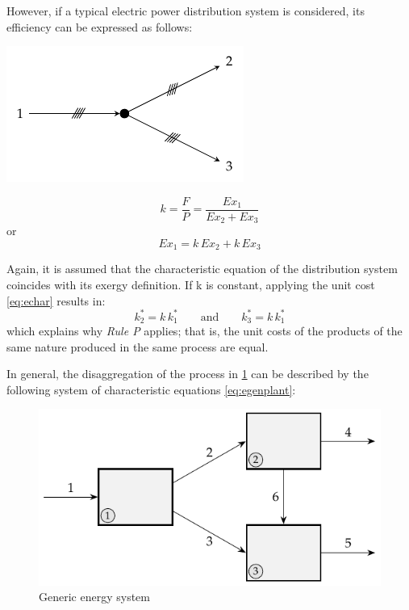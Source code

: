 \documentclass[energies,article,submit,moreauthors,pdftex]{Definitions/mdpi}
\begin{document}
However, if a typical electric power distribution system is considered, its efficiency can be expressed as follows:
\begin{center}
  \begin{minipage}[c]{0.50\linewidth}
   \centering
    \includegraphics[width=0.8\linewidth]{distribucion}
  \end{minipage}
  \begin{minipage}[c]{0.48\linewidth}
    \centering
    \begin{equation*}
        k=\frac{F}{P}=\frac{Ex_1}{Ex_2+Ex_3}
        \label{eq:dist}
    \end{equation*}
    or
    \begin{equation*}
        Ex_1=k\,Ex_2+k\,Ex_3
    \end{equation*}
  \end{minipage}
  \label{fig:distributor}
\end{center}

Again, it is assumed that the characteristic equation of the distribution system coincides with its exergy definition. If k is constant, applying the unit cost \cref{eq:echar} results in:
\begin{equation}
    k_2^*=k\,k_1^*     \qquad \text{and}\qquad    k_3^*=k\,k_1^*
\end{equation}
which explains why \emph{Rule P} applies; that is, the unit costs of the products of the same nature produced in the same process are equal.

In general, the disaggregation of the process in \cref{fig:genplant} can be described by the following system of characteristic equations \eqref{eq:egenplant}: 
\begin{figure}[H]
    \centering
    \includegraphics{genplant}
    \caption{Generic energy system}
    \label{fig:genplant}
\end{figure}
\end{document}

